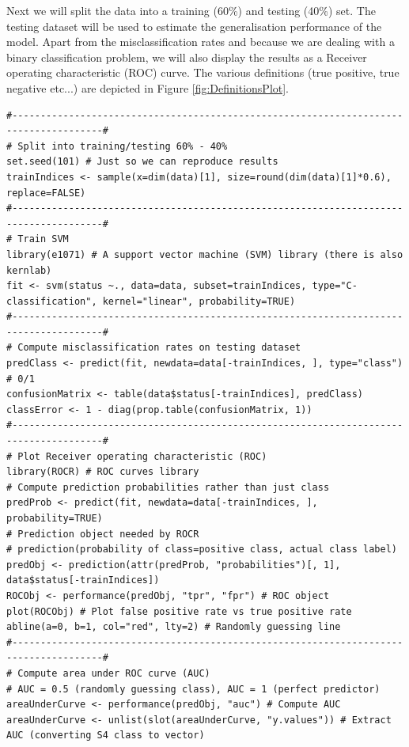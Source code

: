 \documentclass[a4paper,11pt]{article}
\begin{document}
Next we will split the data into a training (60\%) and testing (40\%) set. The testing dataset will
be used to estimate the generalisation performance of the model. Apart from the misclassification
rates and because we are dealing with a binary classification problem, we will also display the results 
as a Receiver operating characteristic (ROC) curve. The various definitions (true positive, true negative etc...)
are depicted in Figure \ref{fig:DefinitionsPlot}.
\clearpage
\begin{lstlisting}[style=RCode]
#--------------------------------------------------------------------------------------#
# Split into training/testing 60% - 40%
set.seed(101) # Just so we can reproduce results
trainIndices <- sample(x=dim(data)[1], size=round(dim(data)[1]*0.6), replace=FALSE)
#--------------------------------------------------------------------------------------#
# Train SVM
library(e1071) # A support vector machine (SVM) library (there is also kernlab)
fit <- svm(status ~., data=data, subset=trainIndices, type="C-classification", kernel="linear", probability=TRUE)
#--------------------------------------------------------------------------------------#
# Compute misclassification rates on testing dataset
predClass <- predict(fit, newdata=data[-trainIndices, ], type="class") # 0/1
confusionMatrix <- table(data$status[-trainIndices], predClass)
classError <- 1 - diag(prop.table(confusionMatrix, 1))
#--------------------------------------------------------------------------------------#
# Plot Receiver operating characteristic (ROC)
library(ROCR) # ROC curves library
# Compute prediction probabilities rather than just class
predProb <- predict(fit, newdata=data[-trainIndices, ], probability=TRUE)
# Prediction object needed by ROCR
# prediction(probability of class=positive class, actual class label)
predObj <- prediction(attr(predProb, "probabilities")[, 1], data$status[-trainIndices]) 
ROCObj <- performance(predObj, "tpr", "fpr") # ROC object
plot(ROCObj) # Plot false positive rate vs true positive rate
abline(a=0, b=1, col="red", lty=2) # Randomly guessing line
#--------------------------------------------------------------------------------------#
# Compute area under ROC curve (AUC)
# AUC = 0.5 (randomly guessing class), AUC = 1 (perfect predictor)
areaUnderCurve <- performance(predObj, "auc") # Compute AUC
areaUnderCurve <- unlist(slot(areaUnderCurve, "y.values")) # Extract AUC (converting S4 class to vector)
\end{lstlisting}
\end{document}
